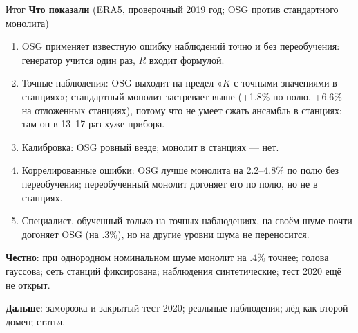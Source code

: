 \documentclass[10pt,aspectratio=169]{beamer}
\begin{document}
\begin{frame}{Итог}
\small
\textbf{Что показали} (ERA5, проверочный 2019 год; OSG против стандартного монолита)
\begin{enumerate}
\item OSG применяет известную ошибку наблюдений точно и без переобучения: генератор учится один раз, $R$ входит формулой.
\item Точные наблюдения: OSG выходит на предел «$K$ с точными значениями в станциях»; стандартный монолит застревает выше (+1.8\% по полю, +6.6\% на отложенных станциях), потому что не умеет сжать ансамбль в станциях: там он в 13--17 раз хуже прибора.
\item Калибровка: OSG ровный везде; монолит в станциях --- нет.
\item Коррелированные ошибки: OSG лучше монолита на 2.2--4.8\% по полю без переобучения; переобученный монолит догоняет его по полю, но не в станциях.
\item Специалист, обученный только на точных наблюдениях, на своём шуме почти догоняет OSG (на .3\%), но на другие уровни шума не переносится.
\end{enumerate}
\textbf{Честно}: при однородном номинальном шуме монолит на .4\% точнее; голова гауссова; сеть станций фиксирована; наблюдения синтетические; тест 2020 ещё не открыт.

\textbf{Дальше}: заморозка и закрытый тест 2020; реальные наблюдения; лёд как второй домен; статья.
\end{frame}
\end{document}
